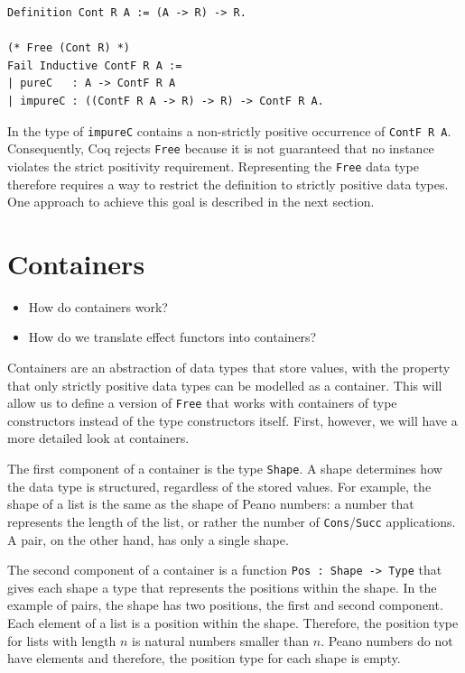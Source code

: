 \documentclass[a4paper, 11pt, fleqn, twoside]{scrreprt}
\begin{document}
\begin{verbatim}
Definition Cont R A := (A -> R) -> R.

(* Free (Cont R) *)
Fail Inductive ContF R A :=
| pureC   : A -> ContF R A
| impureC : ((ContF R A -> R) -> R) -> ContF R A.
\end{verbatim}

In the type of \texttt{impureC} contains a non-strictly positive 
occurrence of \texttt{ContF R A}. Consequently, Coq rejects 
\texttt{Free} because it is not guaranteed that no instance violates 
the strict positivity requirement. Representing the \texttt{Free} data 
type therefore requires a way to restrict the definition to strictly positive 
data types. One approach to achieve this goal is described in the next section.

\section{Containers}

\begin{itemize}
\item How do containers work?
\item How do we translate effect functors into containers?
\end{itemize}

Containers are an abstraction of data types that store values, with the 
property that only strictly positive data types can be modelled as a container. 
This will allow us to define a version of \texttt{Free} that works 
with containers of type constructors instead of the type constructors itself. 
First, however, we will have a more detailed look at containers.

The first component of a container is the type \texttt{Shape}. A 
shape determines how the data type is structured, regardless of the stored 
values. For example, the  shape of a list is the same as the shape of Peano 
numbers: a number that  represents the length of the list, or rather the number 
of \texttt{Cons}/\texttt{Succ} applications. A pair, 
on the other hand, has only a single shape.

The second component of a container is a function \texttt{Pos : Shape 
-> Type} that gives each shape a type that represents the positions within the 
shape. In the example of pairs, the shape has two positions, the first and 
second component. Each element of a list is a position within the shape. 
Therefore, the position type for lists with length $n$ is natural numbers 
smaller than $n$. Peano numbers do not have elements and therefore, the 
position type for each shape is empty.
\end{document}
